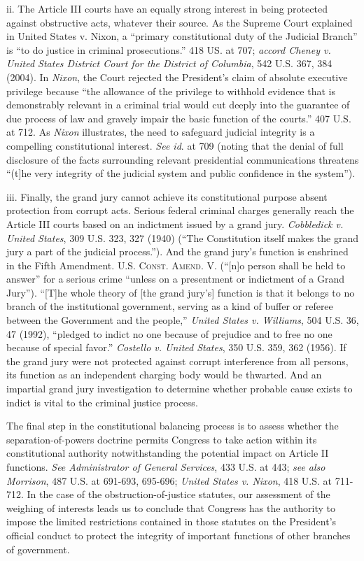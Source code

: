 ii. The Article III courts have an equally strong interest in being protected against obstructive acts, whatever their source.
As the Supreme Court explained in United States v. Nixon, a “primary constitutional duty of the Judicial Branch” is “to do justice in criminal prosecutions.” 418 US. at 707;
\textit{accord Cheney v. United States District Court for the District of Columbia}, 542 U.S. 367, 384 (2004).
In \textit{Nixon}, the Court rejected the President’s claim of absolute executive privilege because “the allowance of the privilege to withhold evidence that is demonstrably relevant in a criminal trial would cut deeply into the guarantee of due process of law and gravely impair the basic function of the courts.” 407 U.S. at 712.
As \textit{Nixon} illustrates, the need to safeguard judicial integrity is a compelling constitutional interest.
\textit{See id}. at 709 (noting that the denial of full disclosure of the facts surrounding relevant presidential communications threatens “(t]he very integrity of the judicial system and public confidence in the system”).

iii. Finally, the grand jury cannot achieve its constitutional purpose absent protection from corrupt acts.
Serious federal criminal charges generally reach the Article III courts based on an indictment issued by a grand jury.
\textit{Cobbledick v. United States}, 309 U.S. 323, 327 (1940) (“The Constitution itself makes the grand jury a part of the judicial process.”).
And the grand jury’s function is enshrined in the Fifth Amendment.
\textsc{U.S. Const. Amend. V}. (“[n]o person shall be held to answer” for a serious crime “unless on a presentment or indictment of a Grand Jury”).
“[T]he whole theory of [the grand jury’s] function is that it belongs to no branch of the institutional government, serving as a kind of buffer or referee between the Government and the people,” \textit{United States v. Williams}, 504 U.S. 36, 47 (1992), “pledged to indict no one because of prejudice and to free no one because of special favor.”
\textit{Costello v. United States}, 350 U.S. 359, 362 (1956).
If the grand jury were not protected against corrupt interference from all persons, its function as an independent charging body would be thwarted.
And an impartial grand jury investigation to determine whether probable cause exists to indict is vital to the criminal justice process.

\hr

The final step in the constitutional balancing process is to assess whether the separation-of-powers doctrine permits Congress to take action within its constitutional authority notwithstanding the potential impact on Article II functions.
\textit{See Administrator of General Services}, 433 U.S. at 443;
\textit{see also Morrison}, 487 U.S. at 691-693, 695-696;
\textit{United States v. Nixon}, 418 U.S. at 711-712.
In the case of the obstruction-of-justice statutes, our assessment of the weighing of interests leads us to conclude that Congress has the authority to impose the limited restrictions contained in those statutes on the President’s official conduct to protect the integrity of important functions of other branches of government.

